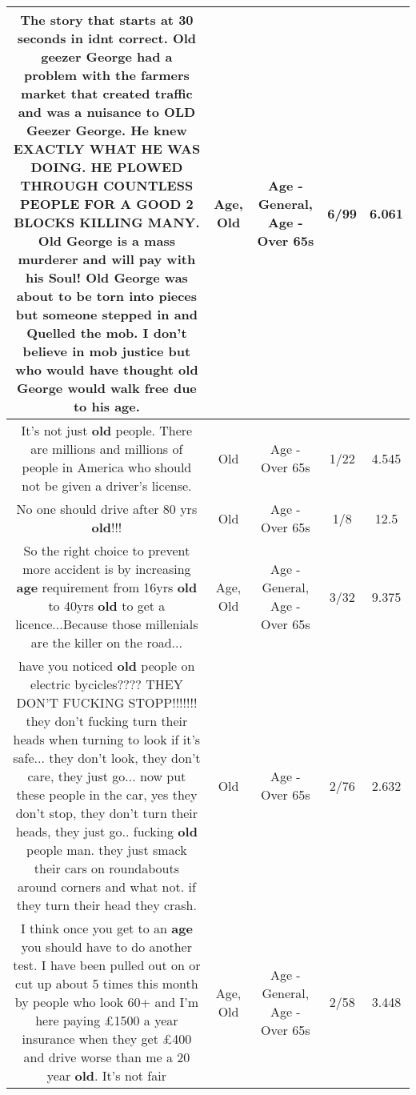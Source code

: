 \documentclass[11pt]{article}
\newlength\mylength
\begin{document}
\begin{center}
\begin{longtable}{|C{.65\mylength}|C{.30\mylength}|C{.12\mylength}|C{.12\mylength}|C{.12\mylength}|}
  \small The story that starts at 30 seconds in idnt correct. \textbf{Old} geezer George had a problem with the farmers market that created traffic and was a nuisance to \textbf{OLD} Geezer George. He knew EXACTLY WHAT HE WAS DOING.  HE PLOWED THROUGH COUNTLESS PEOPLE FOR A GOOD 2 BLOCKS KILLING MANY.  \textbf{Old} George is a mass murderer and will pay with his Soul! \textbf{Old} George was about to be torn into pieces but someone stepped in and Quelled the mob. I don't believe in mob justice but who would have thought \textbf{old} George would walk free due to his \textbf{age}.\normalsize   & Age, Old & Age - General, Age - Over 65s & 6/99 & 6.061 \\  \hline
  \small It's not just \textbf{old} people.  There are millions and millions of people in America who should not be given a driver's license.\normalsize   & Old & Age - Over 65s & 1/22 & 4.545 \\  \hline
  \small No one should drive after 80 yrs \textbf{old}!!!\normalsize   & Old & Age - Over 65s & 1/8 & 12.5 \\  \hline
  \small So the right choice to prevent more accident is by increasing \textbf{age} requirement from 16yrs \textbf{old} to 40yrs \textbf{old} to get a licence...Because those millenials are the killer on the road...\normalsize   & Age, Old & Age - General, Age - Over 65s & 3/32 & 9.375 \\  \hline
  \small have you noticed \textbf{old} people on electric bycicles???? THEY DON'T FUCKING STOPP!!!!!!! they don't fucking turn their heads when turning to look if it's safe... they don't look, they don't care, they just go... now put these people in the car, yes they don't stop, they don't turn their heads, they just go.. fucking \textbf{old} people man. they just smack their cars on roundabouts around corners and what not. if they turn their head they crash.\normalsize   & Old & Age - Over 65s & 2/76 & 2.632 \\  \hline
  \small I think once you get to an \textbf{age} you should have to do another test. I have been pulled out on or cut up about 5 times this month by people who look 60+ and I'm here paying £1500 a year insurance when they get £400 and drive worse than me a 20 year \textbf{old}. It's not fair\normalsize   & Age, Old & Age - General, Age - Over 65s & 2/58 & 3.448 \\  \hline

\end{longtable}
\end{center}
\end{document}
